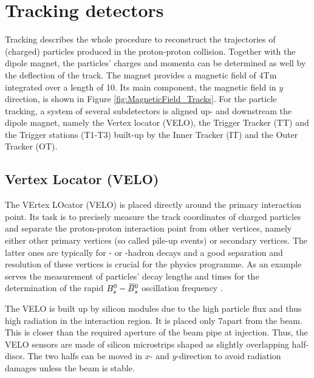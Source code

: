 \section{Tracking detectors}
Tracking describes the whole procedure to reconstruct the trajectories of (charged) particles produced in the proton-proton collision. 
Together with the dipole magnet, the particles' charges and momenta can be determined as well by the deflection of the track.
The magnet provides a magnetic field of 4\unit{Tm} integrated over a length of 10\m.
Its main component, the magnetic field in $y$ direction, is shown in Figure \ref{fig:MagneticField_Tracks}.
For the particle tracking, a system of several subdetectors is aligned up- and downstream the dipole magnet, namely the Vertex locator (VELO), the Trigger Tracker (TT) and the Trigger stations (T1-T3) built-up by the Inner Tracker (IT) and the Outer Tracker (OT).

\subsection{Vertex Locator (VELO)}
The VErtex LOcator (VELO) is placed directly around the primary interaction point. 
Its task is to precisely measure the track coordinates of charged particles and separate the proton-proton interaction point from other vertices, namely either other primary vertices (so called pile-up events) or secondary vertices. 
The latter ones are typically for \bquark- or \cquark-hadron decays \cite{VELO_TDR} and a good separation and resolution of these vertices is crucial for the \lhcb physics programme.
As an example serves the measurement of particles' decay lengths and times for the determination of the rapid ${{B}^0_{s}}-{{\kern 0.18em\overline{\kern -0.18em B}{}}{}^0_{s}}$ oscillation frequency \cite{BsBsbar_frequency}.

The VELO is built up by silicon modules due to the high particle flux and thus high radiation in the interaction region. 
It is placed only 7\mm apart from the beam. 
This is closer than the required aperture of the \lhcb beam pipe at injection. 
Thus, the VELO sensors are made of silicon microstrips shaped as slightly overlapping half-discs. 
The two halfs can be moved in $x$- and $y$-direction to avoid radiation damages unless the beam is stable.

